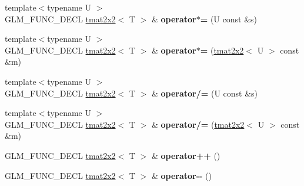 \begin{DoxyCompactItemize}
\item 
\hypertarget{structglm_1_1detail_1_1tmat2x2_a00ce4e85d2a1aa5c76170e16adf7b66c}{{\footnotesize template$<$typename U $>$ }\\\-G\-L\-M\-\_\-\-F\-U\-N\-C\-\_\-\-D\-E\-C\-L \hyperlink{structglm_1_1detail_1_1tmat2x2}{tmat2x2}$<$ \-T $>$ \& {\bfseries operator$\ast$=} (\-U const \&s)}\label{structglm_1_1detail_1_1tmat2x2_a00ce4e85d2a1aa5c76170e16adf7b66c}

\item 
\hypertarget{structglm_1_1detail_1_1tmat2x2_a13d83b5e232913d9dd224029dd43c586}{{\footnotesize template$<$typename U $>$ }\\\-G\-L\-M\-\_\-\-F\-U\-N\-C\-\_\-\-D\-E\-C\-L \hyperlink{structglm_1_1detail_1_1tmat2x2}{tmat2x2}$<$ \-T $>$ \& {\bfseries operator$\ast$=} (\hyperlink{structglm_1_1detail_1_1tmat2x2}{tmat2x2}$<$ \-U $>$ const \&m)}\label{structglm_1_1detail_1_1tmat2x2_a13d83b5e232913d9dd224029dd43c586}

\item 
\hypertarget{structglm_1_1detail_1_1tmat2x2_a8bbad168a4844185aaf709aaacd17f0a}{{\footnotesize template$<$typename U $>$ }\\\-G\-L\-M\-\_\-\-F\-U\-N\-C\-\_\-\-D\-E\-C\-L \hyperlink{structglm_1_1detail_1_1tmat2x2}{tmat2x2}$<$ \-T $>$ \& {\bfseries operator/=} (\-U const \&s)}\label{structglm_1_1detail_1_1tmat2x2_a8bbad168a4844185aaf709aaacd17f0a}

\item 
\hypertarget{structglm_1_1detail_1_1tmat2x2_ac7d2c827d42b133c6b2915d1c9a2a7b4}{{\footnotesize template$<$typename U $>$ }\\\-G\-L\-M\-\_\-\-F\-U\-N\-C\-\_\-\-D\-E\-C\-L \hyperlink{structglm_1_1detail_1_1tmat2x2}{tmat2x2}$<$ \-T $>$ \& {\bfseries operator/=} (\hyperlink{structglm_1_1detail_1_1tmat2x2}{tmat2x2}$<$ \-U $>$ const \&m)}\label{structglm_1_1detail_1_1tmat2x2_ac7d2c827d42b133c6b2915d1c9a2a7b4}

\item 
\hypertarget{structglm_1_1detail_1_1tmat2x2_a04457c562f83f2f5d34bc5fa574faa17}{\-G\-L\-M\-\_\-\-F\-U\-N\-C\-\_\-\-D\-E\-C\-L \hyperlink{structglm_1_1detail_1_1tmat2x2}{tmat2x2}$<$ \-T $>$ \& {\bfseries operator++} ()}\label{structglm_1_1detail_1_1tmat2x2_a04457c562f83f2f5d34bc5fa574faa17}

\item 
\hypertarget{structglm_1_1detail_1_1tmat2x2_a31bbbcc16ab65eef93820ebce0cfed5f}{\-G\-L\-M\-\_\-\-F\-U\-N\-C\-\_\-\-D\-E\-C\-L \hyperlink{structglm_1_1detail_1_1tmat2x2}{tmat2x2}$<$ \-T $>$ \& {\bfseries operator-\/-\/} ()}\label{structglm_1_1detail_1_1tmat2x2_a31bbbcc16ab65eef93820ebce0cfed5f}


\end{DoxyCompactItemize}
